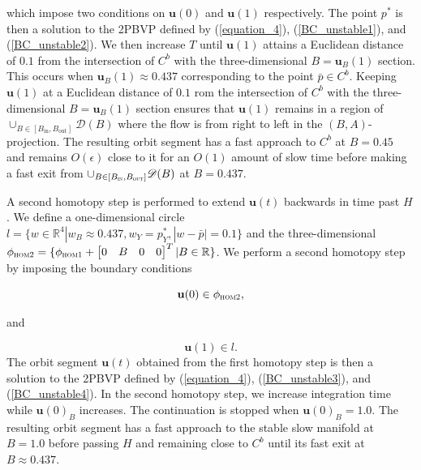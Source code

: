 \documentclass{ws-ijbc}
\begin{document}
\noindent
which impose two conditions on $\mathbf{u}(0)$ and $\mathbf{u}(1)$ respectively.  The point $p^*$ is then a solution to the 2PBVP defined by (\ref{equation_4}), (\ref{BC_unstable1}), and (\ref{BC_unstable2}).  We then increase $T$ until $\mathbf{u}(1)$ attains a Euclidean distance of $0.1$ from the intersection of $C^b$ with the three-dimensional $B = \mathbf{u}_B(1)$ section.  This occurs when $ \mathbf{u}_B(1) \approx 0.437$ corresponding to the point $\bar{p} \in C^b$.  Keeping $\mathbf{u}(1)$ at a Euclidean distance of $0.1$ rom the intersection of $C^b$ with the three-dimensional $B = \mathbf{u}_B(1)$ section ensures that $\mathbf{u}(1)$ remains in a region of $\cup_{B \in [B_{\mathrm{in}}, B_{\mathrm{out}}]}\mathscr{D}(B)$ where the flow is from right to left in the $(B,A)$-projection.  The resulting orbit segment has a fast approach to $C^b$ at $B=0.45$ and remains $O(\epsilon)$ close to it for an $O(1)$ amount of slow time before making a fast exit from $\cup_{B\in[B_{\textsc{in}}, B_{\textsc{out}}]} \mathscr{D}(B)$ at $B=0.437$.

A second homotopy step is performed to extend $\mathbf{u}(t)$ backwards in time past $H$.  We define a one-dimensional circle $l = \{w \in \mathbb{R}^4 | w_B \approx 0.437, w_Y =p^*_Y, |w-\bar{p}| = 0.1\}$ and the three-dimensional $\phi_{\textsc{hom2}} = \{\phi_{\textsc{hom1}} + \begin{bmatrix} 0 & B & 0 & 0 \end{bmatrix}^{T}| B \in \mathbb{R} \}$.  We perform a second homotopy step by imposing the boundary conditions

\begin{equation}
\mathbf{u}(0) \in \phi_{\textsc{hom2}},
\label{BC_unstable3}
\end{equation}

and

\begin{equation}
\mathbf{u}(1) \in l.
\label{BC_unstable4}
\end{equation}
\noindent
The orbit segment $\mathbf{u}(t)$ obtained from the first homotopy step is then a solution to the 2PBVP defined by (\ref{equation_4}), (\ref{BC_unstable3}), and (\ref{BC_unstable4}).  In the second homotopy step, we increase integration time while $\mathbf{u}(0)_B$ increases.  The continuation is stopped when $\mathbf{u}(0)_B=1.0$.  The resulting orbit segment has a fast approach to the stable slow manifold at $B=1.0$ before passing $H$ and remaining close to $C^b$ until its fast exit at $B \approx 0.437$.  
\end{document}
